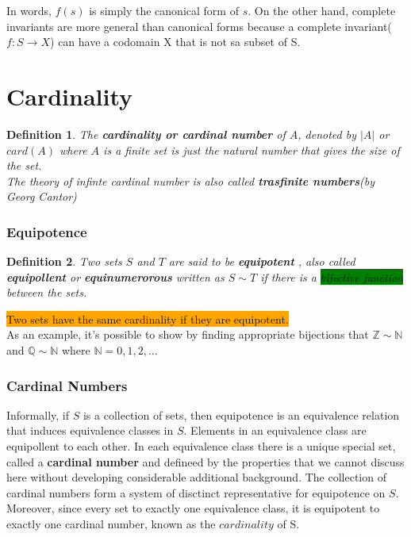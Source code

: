 \documentclass[12pt]{article}
\let\to=\rightarrow
\newcommand{\mybox}[2][black]{\colorbox{#1}{#2}}
\newcommand{\NN}{\mathbb{N}}
\newcommand{\ZZ}{\mathbb{Z}}
\newcommand{\QQ}{\mathbb{Q}}
\newtheorem{definition}{Definition}
\begin{document}
In words, $f(s)$ is simply the canonical form of $s$. On the other hand, complete invariants are more general than canonical forms because a complete invariant($f: S \to X$) can have a codomain X that is not sa subset of S.


\section{Cardinality}
\begin{definition}
The \textbf{cardinality or cardinal number} of $A$, denoted by $|A|$ or $card(A)$ where $A$ is a finite set is just the natural number that gives the size of the set.\\

The theory of infinte cardinal number is also called \textbf{trasfinite numbers}(by Georg Cantor)

\end{definition}


\subsubsection{Equipotence}

\begin{definition}

Two sets $S$ and $T$ are said to be \textbf{equipotent} , also called \textbf{equipollent} or \textbf{equinumerorous} written as $S \sim T$ if there is a \mybox[green]{bijective function} between the sets.
\end{definition}

\mybox[orange]{Two sets have the same cardinality if they are equipotent.}\\

As an example, it's possible to show by finding appropriate bijections that $\ZZ \sim \NN$ and $\QQ \sim \NN$ where $\NN = {0,1,2, \ldots}$

\subsubsection{Cardinal Numbers}

Informally, if $S$ is a collection of sets, then equipotence is an equivalence relation that induces equivalence classes in $S$. Elements in an equivalence class are equipollent to each other. In each equivalence class there is a unique special set, called a \textbf{cardinal number} and defineed by the properties that we cannot discuss here without developing considerable additional background. The collection of cardinal numbers form a system of disctinct representative for equipotence on $S$. Moreover, since every set to exactly one equivalence class, it is equipotent to exactly one cardinal number, known as the $cardinality$ of S. \\
\end{document}
